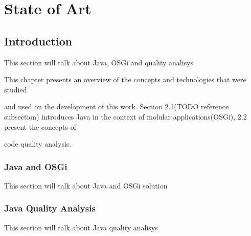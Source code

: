 \chapter{State of Art}

\section{Introduction}
This section will talk about Java, OSGi and quality analisys

This chapter presents an overview of the concepts and technologies that were studied

and used on the development of this work. Section 2.1(TODO reference subsection) introduces Java in the context of molular applications(OSGi), 2.2 present the concepts of

code quality analysis.  

\subsection{Java and OSGi}
This section will talk about Java and OSGi solution

\subsection{Java Quality Analysis}
This section will talk about Java quality analisys

